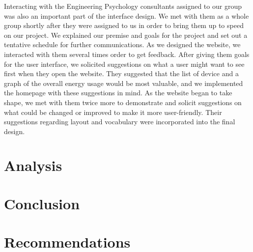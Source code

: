 \documentclass[12pt]{article}
\begin{document}
Interacting with the
Engineering Psychology consultants assigned to our group was also an
important part of the interface design. We met with
them as a whole group shortly after they were assigned to us in order
to bring them up to speed on our project. We explained our premise
and goals for the project and set out a tentative schedule for
further communications. As we designed the website, we interacted
with them several times order to get feedback. After giving them
goals for the user interface, we solicited suggestions on what a user
might want to see first when they open the website. They suggested
that the list of device and a graph of the overall energy usage would
be most valuable, and we implemented the homepage with these
suggestions in mind. As the website began to take shape, we met with
them twice more to demonstrate and solicit suggestions on what could
be changed or improved to make it more user-friendly. Their
suggestions regarding layout and vocabulary were incorporated into
the final design. 

\section{Analysis}



\section{Conclusion}


\section{Recommendations}
\end{document}
